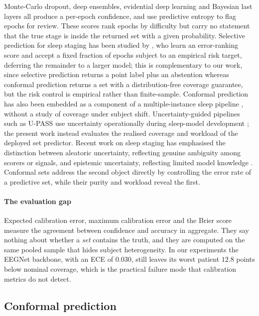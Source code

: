 Monte-Carlo dropout, deep ensembles, evidential deep learning and Bayesian
last layers all produce a per-epoch confidence, and \citet{phan2022sleepformer}
use predictive entropy to flag epochs for review. These scores rank epochs by
difficulty but carry no statement that the true stage is inside the returned
set with a given probability. Selective prediction for sleep staging has been
studied by \citet{cover2026}, who learn an error-ranking score and accept a
fixed fraction of epochs subject to an empirical risk target, deferring the
remainder to a larger model; this is complementary to our work, since
selective prediction returns a point label plus an abstention whereas
conformal prediction returns a set with a distribution-free coverage
guarantee, but the risk control is empirical rather than finite-sample.
Conformal prediction has also been embedded as a component of a
multiple-instance sleep pipeline \citep{conmil2025}, without a study of
coverage under subject shift. Uncertainty-guided pipelines such as U-PASS
use uncertainty operationally during sleep-model development
\citep{heremans2024upass}; the present work instead evaluates the realised
coverage and workload of the deployed set predictor. Recent work on sleep
staging has emphasised the distinction between aleatoric uncertainty,
reflecting genuine ambiguity among scorers or signals, and epistemic
uncertainty, reflecting limited model knowledge \citep{vangorp2022certainty}.
Conformal sets address the second object directly by controlling the error
rate of a predictive set, while their purity and workload reveal the first.

\paragraph{The evaluation gap}
Expected calibration error, maximum calibration error and the Brier score
measure the agreement between confidence and accuracy in aggregate. They say
nothing about whether a \emph{set} contains the truth, and they are computed
on the same pooled sample that hides subject heterogeneity. In our
experiments the EEGNet backbone, with an ECE of $0.030$, still leaves its
worst patient $12.8$ points below nominal coverage, which is the practical
failure mode that calibration metrics do not detect.

\subsection{Conformal prediction}
\label{sec:related-cp}


